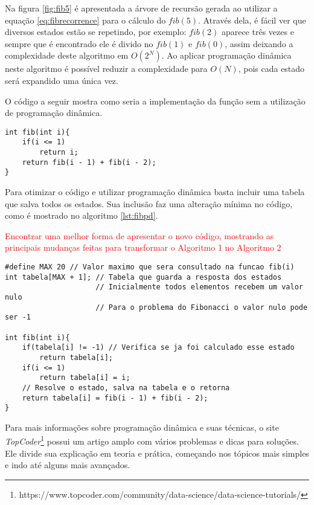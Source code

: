 Na figura \ref{fig:fib5} é apresentada a árvore de recursão gerada ao utilizar a equação \ref{eq:fibrecorrence} para o cálculo do $fib(5)$. Através dela, é fácil ver que diversos estados estão se repetindo, por exemplo: $fib(2)$ aparece três vezes e sempre que é encontrado ele é divido no $fib(1)$ e $fib(0)$, assim deixando a  complexidade deste algoritmo em $O(2^{N})$. Ao aplicar programação dinâmica neste algoritmo é possível reduzir a complexidade para $O(N)$, pois cada estado será expandido uma única vez.

O código a seguir mostra como seria a implementação da função sem a utilização de programação dinâmica.
\begin{lstlisting}[caption={Implementação Fibonacci sem programação dinâmica},label={lst:fibsimples}]
int fib(int i){
	if(i <= 1)
		return i;
	return fib(i - 1) + fib(i - 2);
}

\end{lstlisting}

Para otimizar o código e utilizar programação dinâmica basta incluir uma tabela que salva todos os estados. Sua inclusão faz uma alteração mínima no código, como é mostrado no algoritmo \ref{lst:fibpd}.

\textcolor{red}{Encontrar uma melhor forma de apresentar o novo código, mostrando as principais mudanças feitas para transformar o Algoritmo 1 no Algoritmo 2}

\begin{lstlisting}[caption={Implementação Fibonacci com programação dinâmica},label={lst:fibpd}]
#define MAX 20 // Valor maximo que sera consultado na funcao fib(i)
int tabela[MAX + 1]; // Tabela que guarda a resposta dos estados
					 // Inicialmente todos elementos recebem um valor nulo
					 // Para o problema do Fibonacci o valor nulo pode ser -1
					 
int fib(int i){
	if(tabela[i] != -1) // Verifica se ja foi calculado esse estado
		return tabela[i];
	if(i <= 1)
		return tabela[i] = i;
	// Resolve o estado, salva na tabela e o retorna
	return tabela[i] = fib(i - 1) + fib(i - 2);
}
\end{lstlisting}

Para mais informações sobre programação dinâmica e suas técnicas, o site \textit{TopCoder}\footnote{https://www.topcoder.com/community/data-science/data-science-tutorials/} possui um artigo amplo com vários problemas e dicas para soluções. Ele divide sua explicação em teoria e prática, começando nos tópicos mais simples e indo até alguns mais avançados.

